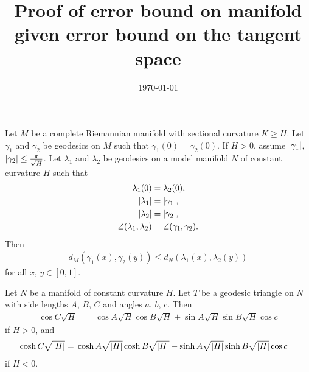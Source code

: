 \documentclass[english, a4paper, 12pt]{article}
\title{Proof of error bound on manifold given error bound on the tangent space}
\author{}
\date{\today}
\begin{document}
\maketitle


\begin{theorem}[Toponogov]\label{thm:toponogov}
	Let $M$ be a complete Riemannian manifold with sectional curvature $K \geq H$.
	Let $\gamma_1$ and $\gamma_2$ be geodesics on $M$ such that $\gamma_1(0) = \gamma_2(0)$.
	If $H > 0$, assume $\abs{\gamma_1}$, $\abs{\gamma_2} \leq \frac{\pi}{\sqrt{H}}$.
	Let $\lambda_1$ and $\lambda_2$ be geodesics on a model manifold $N$ of constant curvature $H$ such that
	\begin{align}
		\lambda_1(0) ={}& \lambda_2(0),\\
		\abs{\lambda_1} ={}& \abs{\gamma_1},\\
		\abs{\lambda_2} ={}& \abs{\gamma_2},\\
		\angle(\lambda_1, \lambda_2) ={}& \angle(\gamma_1, \gamma_2).
	\end{align}
	Then
	\begin{align}
		d_{M}(\gamma_1(x), \gamma_2(y)) \leq d_{N}(\lambda_1(x), \lambda_2(y))
	\end{align}
	for all $x$, $y \in [0, 1]$.
\end{theorem}

\begin{lemma}\label{lemma:law_of_cosines}
	Let $N$ be a manifold of constant curvature $H$.
	Let $T$ be a geodesic triangle on $N$ with side lengths $A$, $B$, $C$ and angles $a$, $b$, $c$.
	Then
	\begin{align}
		\cos{C \sqrt{H}} ={}& \cos{A \sqrt{H}} \cos{B \sqrt{H}} + \sin{A \sqrt{H}} \sin{B \sqrt{H}} \cos{c}
	\end{align}
	if $H > 0$, and
	\begin{align}
		\cosh{C \sqrt{\abs{H}}} ={}& \cosh{A \sqrt{\abs{H}}} \cosh{B \sqrt{\abs{H}}} - \sinh{A \sqrt{\abs{H}}} \sinh{B \sqrt{\abs{H}}} \cos{c}
	\end{align}
	if $H < 0$.
\end{lemma}


\begin{lemma}
\end{lemma}
\end{document}
